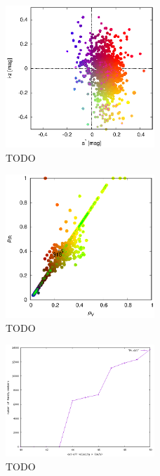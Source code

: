 \documentclass[A4paper, 12pt, oneside]{book}
\begin{document}
\begin{figure}
	\centering
	\includegraphics[width=0.5\textwidth]{obr/astar_iz}
	\caption{TODO}
	\label{astar_iz}
\end{figure}
\begin{figure}
	\centering
	\includegraphics[width=0.5\textwidth]{obr/pV_pIR}
	\caption{TODO}
	\label{pV_pIR}
\end{figure}
\begin{figure}
	\centering
	\includegraphics[width=0.5\textwidth]{obr/Nv}
	\caption{TODO}
	\label{Nv}
\end{figure}
\end{document}
